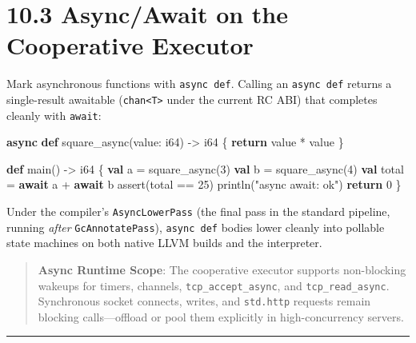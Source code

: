 \documentclass[
  english,
  oneside]{book}
\newenvironment{Shaded}{\begin{snugshade}}{\end{snugshade}}
\newcommand{\ControlFlowTok}[1]{\textcolor[rgb]{0.77,0.53,0.75}{\textbf{#1}}}
\newcommand{\DataTypeTok}[1]{\textcolor[rgb]{0.31,0.79,0.69}{#1}}
\newcommand{\DecValTok}[1]{\textcolor[rgb]{0.71,0.81,0.66}{#1}}
\newcommand{\FunctionTok}[1]{\textcolor[rgb]{0.86,0.86,0.67}{#1}}
\newcommand{\KeywordTok}[1]{\textcolor[rgb]{0.34,0.61,0.84}{\textbf{#1}}}
\newcommand{\NormalTok}[1]{\textcolor[rgb]{0.83,0.83,0.83}{#1}}
\newcommand{\OperatorTok}[1]{\textcolor[rgb]{0.83,0.83,0.83}{#1}}
\newcommand{\StringTok}[1]{\textcolor[rgb]{0.81,0.57,0.47}{#1}}
\begin{document}
\section{10.3 Async/Await on the Cooperative
Executor}\label{asyncawait-on-the-cooperative-executor}

Mark asynchronous functions with \texttt{async\ def}. Calling an
\texttt{async\ def} returns a single-result awaitable
(\texttt{chan\textless{}T\textgreater{}} under the current RC ABI) that
completes cleanly with \texttt{await}:

\begin{Shaded}
\begin{Highlighting}[]
\KeywordTok{async} \KeywordTok{def}\NormalTok{ square\_async(value: }\DataTypeTok{i64}\NormalTok{) }\OperatorTok{{-}\textgreater{}} \DataTypeTok{i64}\NormalTok{ \{}
    \ControlFlowTok{return}\NormalTok{ value }\OperatorTok{*}\NormalTok{ value}
\NormalTok{\}}

\KeywordTok{def}\NormalTok{ main() }\OperatorTok{{-}\textgreater{}} \DataTypeTok{i64}\NormalTok{ \{}
    \KeywordTok{val}\NormalTok{ a }\OperatorTok{=}\NormalTok{ square\_async(}\DecValTok{3}\NormalTok{)}
    \KeywordTok{val}\NormalTok{ b }\OperatorTok{=}\NormalTok{ square\_async(}\DecValTok{4}\NormalTok{)}
    \KeywordTok{val}\NormalTok{ total }\OperatorTok{=} \KeywordTok{await}\NormalTok{ a }\OperatorTok{+} \KeywordTok{await}\NormalTok{ b}
    \FunctionTok{assert}\NormalTok{(total }\OperatorTok{==} \DecValTok{25}\NormalTok{)}
\NormalTok{    println(}\StringTok{"async await: ok"}\NormalTok{)}
    \ControlFlowTok{return} \DecValTok{0}
\NormalTok{\}}
\end{Highlighting}
\end{Shaded}

Under the compiler's \texttt{AsyncLowerPass} (the final pass in the
standard pipeline, running \emph{after} \texttt{GcAnnotatePass}),
\texttt{async\ def} bodies lower cleanly into pollable state machines on
both native LLVM builds and the interpreter.

\begin{quote}
\textbf{Async Runtime Scope}: The cooperative executor supports
non-blocking wakeups for timers, channels, \texttt{tcp\_accept\_async},
and \texttt{tcp\_read\_async}. Synchronous socket connects, writes, and
\texttt{std.http} requests remain blocking calls---offload or pool them
explicitly in high-concurrency servers.
\end{quote}

\begin{center}\rule{0.5\linewidth}{0.5pt}\end{center}
\end{document}

